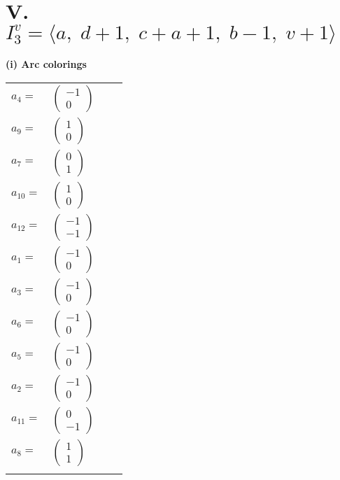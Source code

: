 \documentclass[1p]{elsarticle_modified}
\theoremstyle{definition}
\begin{document}
\centering \section*{V. $I^v_{3}= \langle a,\;d+1,\;c+a+1,\;b-1,\;v+1 \rangle$}
\flushleft \textbf{(i) Arc colorings}\\
\begin{tabular}{m{7pt} m{180pt} m{7pt} m{180pt} }
\flushright $a_{4}=$&$\begin{pmatrix}-1\\0\end{pmatrix}$ \\
\flushright $a_{9}=$&$\begin{pmatrix}1\\0\end{pmatrix}$ \\
\flushright $a_{7}=$&$\begin{pmatrix}0\\1\end{pmatrix}$ \\
\flushright $a_{10}=$&$\begin{pmatrix}1\\0\end{pmatrix}$ \\
\flushright $a_{12}=$&$\begin{pmatrix}-1\\-1\end{pmatrix}$ \\
\flushright $a_{1}=$&$\begin{pmatrix}-1\\0\end{pmatrix}$ \\
\flushright $a_{3}=$&$\begin{pmatrix}-1\\0\end{pmatrix}$ \\
\flushright $a_{6}=$&$\begin{pmatrix}-1\\0\end{pmatrix}$ \\
\flushright $a_{5}=$&$\begin{pmatrix}-1\\0\end{pmatrix}$ \\
\flushright $a_{2}=$&$\begin{pmatrix}-1\\0\end{pmatrix}$ \\
\flushright $a_{11}=$&$\begin{pmatrix}0\\-1\end{pmatrix}$ \\
\flushright $a_{8}=$&$\begin{pmatrix}1\\1\end{pmatrix}$\\&\end{tabular}
\end{document}

